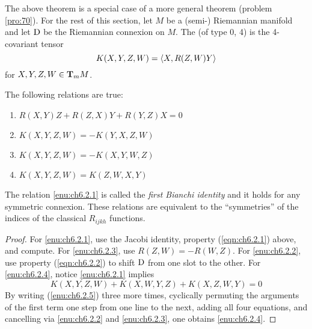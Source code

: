 \documentclass[../main]{subfiles}
\begin{document}
The above theorem is a special case of a more general theorem (problem \ref{pro:70}). For the rest of this section, let $M$ be a (semi-) Riemannian manifold and let $\D$ be the Riemannian connexion on $M$. The  (of type 0, 4) is the 4-covariant tensor
\[K(X,Y,Z,W)=\ip{X}{R(Z,W)Y}\]
for $X,Y,Z,W\in\tangentspace{M}{m}$.



\begin{theorem} \label{thm:ch6.2.2}
The following relations are true:
\begin{enumerate}[label=(\alph*)]

    \item $R(X,Y)Z+R(Z,X)Y+R(Y,Z)X = 0$
    \label{enu:ch6.2.1}

    \item $K(X,Y,Z,W ) =-K(Y,X,Z,W)$
    \label{enu:ch6.2.2}

    \item $K(X,Y,Z,W) = -K(X,Y,W,Z)$
    \label{enu:ch6.2.3}

    \item $K(X,Y,Z,W) = K(Z,W,X,Y)$
    \label{enu:ch6.2.4}
    
\end{enumerate}
The relation \ref{enu:ch6.2.1} is called the \emph{first Bianchi identity} and it holds for any symmetric connexion. These relations are equivalent to the ``symmetries'' of the indices of the classical $R_{ijkh}$ functions.
\end{theorem}

\begin{proof}
For \ref{enu:ch6.2.1}, use the Jacobi identity, property (\ref{eqn:ch6.2.1}) above, and compute. For \ref{enu:ch6.2.3}, use $R(Z,W)=-R(W,Z)$. For \ref{enu:ch6.2.2}, use property (\ref{eqn:ch6.2.2}) to shift $\D$ from one slot to the other. For \ref{enu:ch6.2.4}, notice \ref{enu:ch6.2.1} implies
\begin{equation}\tag{a'} \label{enu:ch6.2.5}
K(X,Y,Z,W)+K(X,W,Y,Z)+K(X,Z,W,Y) = 0
\end{equation}
By writing (\ref{enu:ch6.2.5}) three more times, cyclically permuting the arguments of the first term one step from one line to the next, adding all four equations, and cancelling via \ref{enu:ch6.2.2} and \ref{enu:ch6.2.3}, one obtains \ref{enu:ch6.2.4}.
\end{proof}
\end{document}

